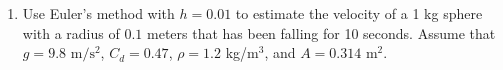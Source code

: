 \documentclass[10pt]{article}
\begin{document}
\begin{enumerate}
\item Use Euler's method with $h = 0.01$ to estimate the velocity of a 1 kg sphere with a radius of $0.1$ meters that has been falling for 10 seconds.  Assume that $g = 9.8 \text{ m}/\text{s}^2$, $C_d = 0.47$, $\rho = 1.2$ kg/m$^3$, and $A = 0.314$ m$^2$. 
\vfill

%

\end{enumerate}
\end{document}
